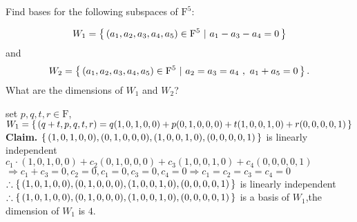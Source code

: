 Find bases for the following subspaces of $\mathrm{F}^5$:

$$ W_1 = \left\{ \,(a_1,a_2,a_3,a_4,a_5) \in \mathrm{F}^5 ~|~ a_1 - a_3 - a_4 = 0 \,\right\} $$
and
$$ W_2 = \left\{ \,(a_1,a_2,a_3,a_4,a_5) \in \mathrm{F}^5 ~|~ a_2 = a_3 = a_4 ~,~ a_1 + a_5 = 0 \,\right\}. $$
What are the dimensions of $W_1$ and $W_2$?


\begin{tcolorbox}
	\begin{solution}
		set $p,q,t,r \in \mathrm{F}$,\\$W_1 = \left\{ \,(q+t,p,q,t,r) = q(1,0,1,0,0)+ p(0,1,0,0,0) + t(1,0,0,1,0) + r(0,0,0,0,1) \,\right\}$\\
		\textbf{Claim.} $\left\{ \,(1,0,1,0,0),(0,1,0,0,0),(1,0,0,1,0),(0,0,0,0,1) \,\right\}$ is linearly independent\\
		$c_1\cdot(1,0,1,0,0) + c_2(0,1,0,0,0) + c_3(1,0,0,1,0)+c_4(0,0,0,0,1)$\\
		$\Rightarrow c_1+c_3=0, c_2 = 0, c_1 = 0, c_3 = 0, c_4 = 0 \Rightarrow c_1=c_2=c_3=c_4=0$\\
		$\therefore \left\{ \,(1,0,1,0,0),(0,1,0,0,0),(1,0,0,1,0),(0,0,0,0,1) \,\right\}$ is linearly independent\\
		$\therefore \left\{ \,(1,0,1,0,0),(0,1,0,0,0),(1,0,0,1,0),(0,0,0,0,1) \,\right\}$ is a basis of $W_1$,the dimension of $W_1$ is $4$.
	\end{solution}
\end{tcolorbox}